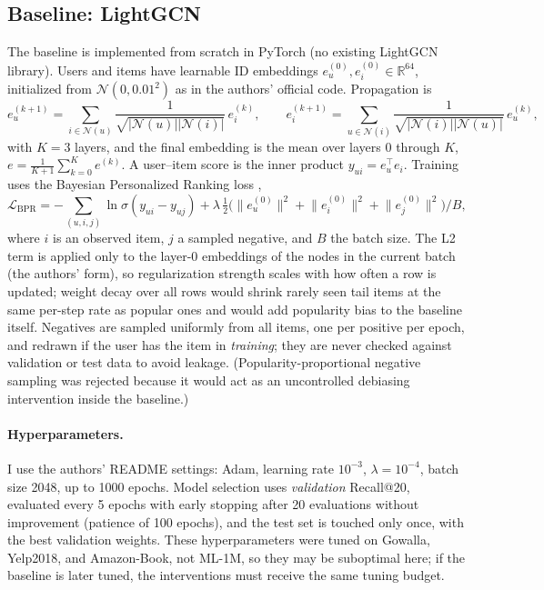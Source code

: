 \documentclass{article}
\begin{document}
\subsection{Baseline: LightGCN}
The baseline is implemented from scratch in PyTorch (no existing LightGCN library). Users and items have learnable ID embeddings $e_u^{(0)}, e_i^{(0)} \in \mathbb{R}^{64}$, initialized from $\mathcal{N}(0, 0.01^2)$ as in the authors' official code. Propagation is
\begin{equation}
e_u^{(k+1)} = \sum_{i \in \mathcal{N}(u)} \frac{1}{\sqrt{|\mathcal{N}(u)||\mathcal{N}(i)|}}\, e_i^{(k)}, \qquad
e_i^{(k+1)} = \sum_{u \in \mathcal{N}(i)} \frac{1}{\sqrt{|\mathcal{N}(i)||\mathcal{N}(u)|}}\, e_u^{(k)},
\end{equation}
with $K=3$ layers, and the final embedding is the mean over layers $0$ through $K$, $e = \frac{1}{K+1}\sum_{k=0}^{K} e^{(k)}$. A user--item score is the inner product $y_{ui} = e_u^\top e_i$. Training uses the Bayesian Personalized Ranking loss \citep{rendle2012bpr},
\begin{equation}
\mathcal{L}_{\text{BPR}} = -\sum_{(u,i,j)} \ln \sigma(y_{ui} - y_{uj}) + \lambda\, \tfrac{1}{2}\big(\lVert e_u^{(0)} \rVert^2 + \lVert e_i^{(0)} \rVert^2 + \lVert e_j^{(0)} \rVert^2\big) / B,
\end{equation}
where $i$ is an observed item, $j$ a sampled negative, and $B$ the batch size. The L2 term is applied only to the layer-0 embeddings of the nodes in the current batch (the authors' form), so regularization strength scales with how often a row is updated; weight decay over all rows would shrink rarely seen tail items at the same per-step rate as popular ones and would add popularity bias to the baseline itself. Negatives are sampled uniformly from all items, one per positive per epoch, and redrawn if the user has the item in \emph{training}; they are never checked against validation or test data to avoid leakage. (Popularity-proportional negative sampling was rejected because it would act as an uncontrolled debiasing intervention inside the baseline.)

\paragraph{Hyperparameters.} I use the authors' README settings: Adam, learning rate $10^{-3}$, $\lambda = 10^{-4}$, batch size 2048, up to 1000 epochs. Model selection uses \emph{validation} Recall@20, evaluated every 5 epochs with early stopping after 20 evaluations without improvement (patience of 100 epochs), and the test set is touched only once, with the best validation weights. These hyperparameters were tuned on Gowalla, Yelp2018, and Amazon-Book, not ML-1M, so they may be suboptimal here; if the baseline is later tuned, the interventions must receive the same tuning budget.
\end{document}
